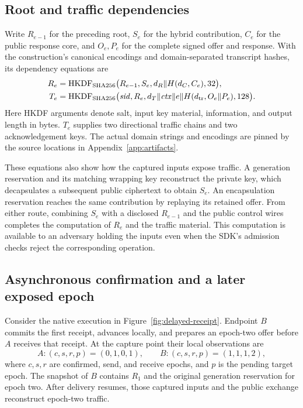 \documentclass[pdflatex]{sn-jnl}
\theoremstyle{thmstyleone}
\theoremstyle{thmstylethree}
\theoremstyle{thmstyletwo}
\begin{document}
\subsection{Root and traffic dependencies}

Write $R_{e-1}$ for the preceding root, $S_e$ for the hybrid contribution,
$C_e$ for the public response core, and $O_e,P_e$ for the complete signed
offer and response. With the construction's canonical encodings and
domain-separated transcript hashes, its dependency equations are
\begin{align}
R_e &=
 \operatorname{HKDF}_{\rm SHA256}
 \bigl(R_{e-1},S_e,d_R\Vert H(d_C,C_e),32\bigr), \label{eq:root}\\
T_e &=
 \operatorname{HKDF}_{\rm SHA256}
 \bigl(\mathit{sid},R_e,
 d_T\Vert\mathit{ctx}\Vert e\Vert H(d_{\rm tr},O_e\Vert P_e),128\bigr).
 \label{eq:traffic}
\end{align}
Here HKDF arguments denote salt, input key material, information, and output
length in bytes. $T_e$ supplies two directional traffic chains and two
acknowledgement keys. The actual domain strings and encodings are pinned by the
source locations in Appendix~\ref{app:artifacts}.

These equations also show how the captured inputs expose traffic. A generation
reservation and its matching wrapping key reconstruct the private key, which
decapsulates a subsequent public ciphertext to obtain $S_e$. An encapsulation
reservation reaches the same contribution by replaying its retained offer.
From either route, combining $S_e$ with a disclosed $R_{e-1}$ and the public
control wires completes the computation of $R_e$ and the traffic material.
This computation is available to an adversary holding the inputs even when
the SDK's admission checks reject the corresponding operation.

\subsection{Asynchronous confirmation and a later exposed epoch}

Consider the native execution in Figure~\ref{fig:delayed-receipt}. Endpoint $B$
commits the first receipt, advances locally, and prepares an epoch-two offer
before $A$ receives that receipt. At the capture point their local observations
are
\[
 A:(c,s,r,p)=(0,1,0,1),\qquad
 B:(c,s,r,p)=(1,1,1,2),
\]
where $c,s,r$ are confirmed, send, and receive epochs, and $p$ is the pending
target epoch. The snapshot of $B$ contains $R_1$ and the original generation
reservation for epoch two. After delivery resumes, those captured inputs and
the public exchange reconstruct epoch-two traffic.
\end{document}
